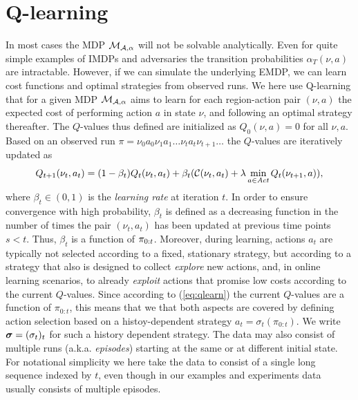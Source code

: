 \documentclass{llncs}
\begin{document}
\section{Q-learning}

In most cases the MDP $\mathcal{M}_{\mathcal{A},\alpha}$ will not be solvable analytically. Even for quite simple
examples of IMDPs and adversaries the transition probabilities $\alpha_T(\nu,a)$ are intractable.
However, if we can simulate the underlying EMDP, we can learn cost functions
and optimal strategies from observed runs. We here use Q-learning that for a given MDP $\mathcal{M}_{\mathcal{A},\alpha}$
aims to learn for each region-action pair $(\nu,a)$ the expected cost of performing action $a$ in
state $\nu$, and following an optimal strategy thereafter. The $Q$-values thus defined are initialized
as  $Q_0(\nu,a)=0$ for all $\nu,a$. Based on an observed run $\pi=\nu_0a_0\nu_1a_1\ldots\nu_ta_t\nu_{t+1}\ldots$
the $Q$-values are iteratively updated as
\begin{equation}
\label{eq:qlearn}
Q_{t+1}(\nu_t,a_t) = (1-\beta_t)Q_t(\nu_t,a_t) + \beta_t( \mathcal{C}(\nu_t,a_t) + \lambda \min_{a\in\mathit{Act}}Q_t(\nu_{t+1},a)  ), 
\end{equation}
where $\beta_t\in(0,1)$ is the \emph{learning rate} at iteration $t$.
In order to ensure convergence with high probability,
$\beta_t$ is defined as a  decreasing function in the number of times the pair $(\nu_t,a_t)$ has been
updated at previous time points $s<t$\cite{jaakkola1993convergence}.
Thus, $\beta_t$ is a function of $\pi_{0:t}$.
Moreover, during
learning, actions $a_t$ are typically not selected according to a fixed, stationary strategy, but
according to a strategy that also is designed to collect \emph{explore} new
actions, and, in online learning scenarios, to already \emph{exploit} actions that promise low
costs according to the current $Q$-values. Since according to (\ref{eq:qlearn}) the current
$Q$-values are a function of $\pi_{0:t}$, this means that we that both aspects are covered by
defining action selection based on a histoy-dependent strategy
$
a_t=\sigma_t(\pi_{0:t}).
$
We write $\boldsymbol{\sigma}=(\sigma_t)_t$ for such a history dependent strategy.
The data may also consist of multiple runs (a.k.a. \emph{episodes}) starting at the same or at different
initial state. For notational simplicity we here take the data to consist of a single long sequence
indexed by $t$, even though in our examples and experiments data usually consists of
multiple episodes.
\end{document}
